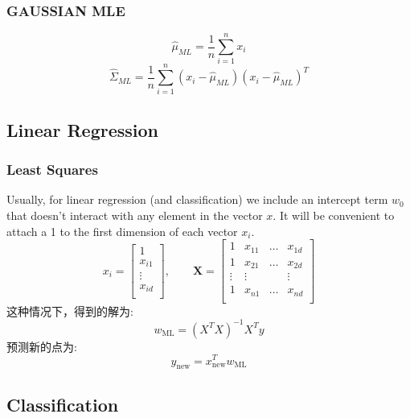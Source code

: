 \documentclass{article} 	%
\begin{document}
		\subsubsection{GAUSSIAN MLE}
			$$\hat{\mu}_{\scriptscriptstyle ML} = \frac{1}{n}\sum_{i=1}^nx_i$$
			$$\hat{\Sigma}_{\scriptscriptstyle ML} = \frac{1}{n}\sum_{i=1}^n(x_i - \hat{\mu}_{\scriptscriptstyle ML})(x_i - \hat{\mu}_{\scriptscriptstyle ML})^T$$
	
	\subsection{Linear Regression}
		\subsubsection{Least Squares}
			Usually, for linear regression (and classification) we include an intercept term $w_0$ that doesn’t interact with any element in the vector $x$. It will be 
			convenient to attach a 1 to the first dimension of each vector $x_i$.
			\[
			x_i = \left [
				\begin{array}{c}
				1\\
				x_{i1}\\
				\vdots\\
				x_{id}\\
				\end{array}
				\right ]
			, \qquad
			\mathbf{X} = \left [
					    \begin{array}{cccc}
					    1 &x_{11}& \ldots & x_{1d}\\
					    1 &x_{21}& \ldots & x_{2d}\\
					    \vdots &\vdots&  & \vdots\\
					    1 &x_{n1}& \ldots & x_{nd}\\
					    \end{array}
					    \right]
			\]
			这种情况下，得到的解为:
			\[
			w_{\scriptscriptstyle \mathrm{ML}} = (X^TX)^{-1}X^Ty
			\]
			预测新的点为:
			$$y_{\scriptscriptstyle\mathrm{new}} = x_{\scriptscriptstyle\mathrm{new}}^Tw_{\scriptscriptstyle \mathrm{ML}} $$
			
	\subsection{Classification}
	
	
			
		
	
\end{document}
